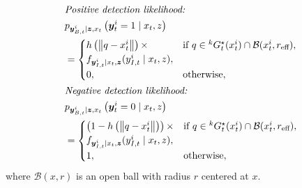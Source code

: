 \documentclass[journal]{IEEEtran}
\begin{document}
\begin{align}
&\textit{Positive detection likelihood:} \nonumber \\
&p_{\bm{y}_{B,t}^i \mid \bm{z},x_t
}\left(\bm{y}_t^i = 1 \mid x_t,z
\right) \nonumber\\
&=\begin{cases}
h\left(\left\|q-x_t^i \right\|\right) \times & \textup{if }q \in {}^kG_t^{\star}(x_t^i)
\cap \mathcal{B}(x_t^i,r_{\text{eff}})
,\nonumber \\
f_{\bm{y}_{I,t}^i \mid x_t,\bm{z}}(y_{I,t}^i \mid x_t,z),  \\
0, & \textup{otherwise},
\end{cases}\nonumber \\
&\textit{Negative detection likelihood:} \nonumber\\
&p_{\bm{y}_{B,t}^i \mid \bm{z},x_t
}\left(\bm{y}_t^i = 0 \mid x_t,z
\right)\nonumber  \\
&=\begin{cases}
\left(1-h\left(\left\|q-x_t^i \right\|\right)\right) \times & \textup{if }q \in {}^kG_t^{\star}(x_t^i) \cap \mathcal{B}(x_t^i,r_{\text{eff}}), \\
f_{\bm{y}_{I,t}^i \mid x_t,\bm{z}}(y_{I,t}^i \mid x_t,z), \\
1,  & \textup{otherwise},
\end{cases}
\label{sensorf}
\end{align}
where $\mathcal{B}(x,r)$ is an open ball with radius $r$ centered at $x$.
\end{document}
